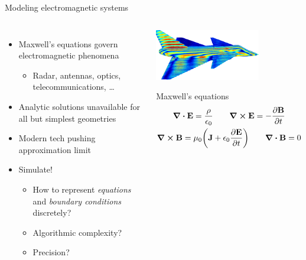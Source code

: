 \documentclass[aspectratio=169, usenames, dvipsnames]{beamer}
\begin{document}
\begin{frame}{Modeling electromagnetic systems}
  \begin{columns}
      \begin{itemize}
        \item Maxwell's equations govern electromagnetic phenomena
          \begin{itemize}
            \item[] Radar, antennas, optics, telecommunications, \ldots
          \end{itemize}
        \item Analytic solutions unavailable for all but simplest geometries
        \item Modern tech pushing approximation limit
        \item Simulate!
          \begin{itemize}
            \item[] How to represent \emph{equations} and \emph{boundary conditions} discretely?
            \item[] Algorithmic complexity?
            \item[] Precision?
          \end{itemize}
      \end{itemize}
    \begin{center}
      \includegraphics[width=0.7\textwidth]{figures/aircraft}
      \vspace{0.3cm}
      \begin{block}{Maxwell's equations}
        \begin{gather*}
          \div \vb{E} = \frac{\rho}{\epsilon_0} \qquad \curl \vb{E} = -\pdv{\vb{B}}{t} \\
          \curl \vb{B} = \mu_0\qty(\vb{J} + \epsilon_0 \pdv{\vb{E}}{t}) \qquad \div \vb{B} = 0
        \end{gather*}
      \end{block}
    \end{center}
  \end{columns}
\end{frame}
\end{document}

